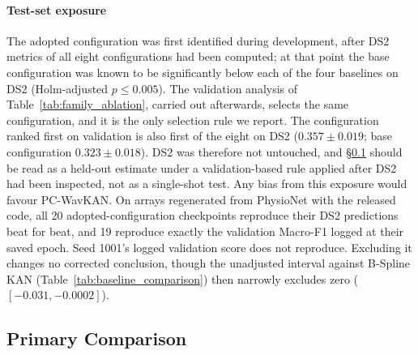 \documentclass[preprint,12pt]{elsarticle}
\begin{document}
\paragraph{Test-set exposure} The adopted configuration was first identified during development, after DS2 metrics of all eight configurations had been computed; at that point the base configuration was known to be significantly below each of the four baselines on DS2 (Holm-adjusted $p \leq 0.005$). The validation analysis of Table~\ref{tab:family_ablation}, carried out afterwards, selects the same configuration, and it is the only selection rule we report. The configuration ranked first on validation is also first of the eight on DS2 ($0.357\pm0.019$; base configuration $0.323\pm0.018$). DS2 was therefore not untouched, and \S\ref{sec:results_primary} should be read as a held-out estimate under a validation-based rule applied after DS2 had been inspected, not as a single-shot test. Any bias from this exposure would favour PC-WavKAN. On arrays regenerated from PhysioNet with the released code, all 20 adopted-configuration checkpoints reproduce their DS2 predictions beat for beat, and 19 reproduce exactly the validation Macro-F1 logged at their saved epoch. Seed 1001's logged validation score does not reproduce. Excluding it changes no corrected conclusion, though the unadjusted interval against B-Spline KAN (Table~\ref{tab:baseline_comparison}) then narrowly excludes zero ($[-0.031, -0.0002]$).

\subsection{Primary Comparison}
\label{sec:results_primary}

\begin{table}[!htbp]
\centering
\caption{\textbf{Primary outcome.} DS2 five-class Macro-F1, PC-WavKAN versus four baselines, 20 paired seeds. $\Delta$, CI and $d_z$ are PC-WavKAN minus baseline; $p$ is Holm-adjusted across the four comparisons.}
\label{tab:baseline_comparison}
\footnotesize
{}
\end{table}
\end{document}
